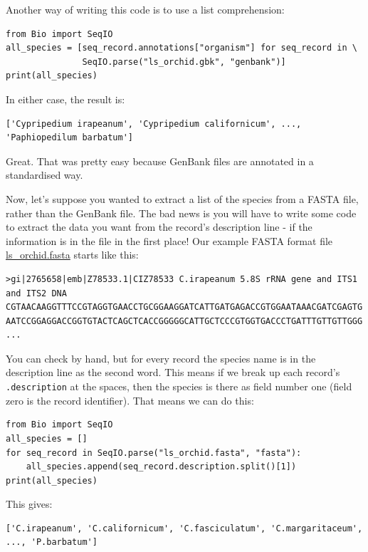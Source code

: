 \documentclass{report}
\begin{document}
Another way of writing this code is to use a list comprehension:

\begin{verbatim}
from Bio import SeqIO
all_species = [seq_record.annotations["organism"] for seq_record in \
               SeqIO.parse("ls_orchid.gbk", "genbank")]
print(all_species)
\end{verbatim}

\noindent In either case, the result is:

\begin{verbatim}
['Cypripedium irapeanum', 'Cypripedium californicum', ..., 'Paphiopedilum barbatum']
\end{verbatim}

Great.  That was pretty easy because GenBank files are annotated in a standardised way.

Now, let's suppose you wanted to extract a list of the species from a FASTA file, rather than the GenBank file.  The bad news is you will have to write some code to extract the data you want from the record's description line - if the information is in the file in the first place!  Our example FASTA format file \href{http://biopython.org/DIST/docs/tutorial/examples/ls_orchid.fasta}{ls\_orchid.fasta} starts like this:

\begin{verbatim}
>gi|2765658|emb|Z78533.1|CIZ78533 C.irapeanum 5.8S rRNA gene and ITS1 and ITS2 DNA
CGTAACAAGGTTTCCGTAGGTGAACCTGCGGAAGGATCATTGATGAGACCGTGGAATAAACGATCGAGTG
AATCCGGAGGACCGGTGTACTCAGCTCACCGGGGGCATTGCTCCCGTGGTGACCCTGATTTGTTGTTGGG
...
\end{verbatim}

You can check by hand, but for every record the species name is in the description line as the second word.  This means if we break up each record's \verb|.description| at the spaces, then the species is there as field number one (field zero is the record identifier).  That means we can do this:

\begin{verbatim}
from Bio import SeqIO
all_species = []
for seq_record in SeqIO.parse("ls_orchid.fasta", "fasta"):
    all_species.append(seq_record.description.split()[1])
print(all_species)
\end{verbatim}

\noindent This gives:

\begin{verbatim}
['C.irapeanum', 'C.californicum', 'C.fasciculatum', 'C.margaritaceum', ..., 'P.barbatum']
\end{verbatim}
\end{document}
